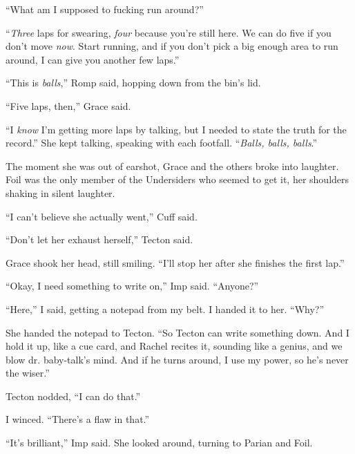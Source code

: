 ``What am I supposed to fucking run around?''



``\emph{Three} laps for swearing, \emph{four} because you're still here.  We can do five if you don't move \emph{now}.  Start running, and if you don't pick a big enough area to run around, I can give you another few laps.''



``This is \emph{balls},'' Romp said, hopping down from the bin's lid.



``Five laps, then,''  Grace said.



``I \emph{know} I'm getting more laps by talking, but I needed to state the truth for the record.''  She kept talking, speaking with each footfall.  ``\emph{Balls, balls, balls}.''



The moment she was out of earshot, Grace and the others broke into laughter.  Foil was the only member of the Undersiders who seemed to get it, her shoulders shaking in silent laughter.



``I can't believe she actually went,'' Cuff said.



``Don't let her exhaust herself,'' Tecton said.



Grace shook her head, still smiling.  ``I'll stop her after she finishes the first lap.''



``Okay, I need something to write on,''  Imp said.  ``Anyone?''



``Here,'' I said, getting a notepad from my belt.  I handed it to her.  ``Why?''



She handed the notepad to Tecton.  ``So Tecton can write something down.  And I hold it up, like a cue card, and Rachel recites it, sounding like a genius, and we blow dr. baby-talk's mind.  And if he turns around, I use my power, so he's never the wiser.''



Tecton nodded, ``I can do that.''



I winced.  ``There's a flaw in that.''



``It's brilliant,'' Imp said.  She looked around, turning to Parian and Foil.



